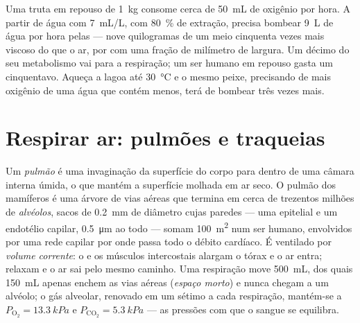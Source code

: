 \begin{example}\label{ex:b1:gas-exchange:priceofwater}
Uma truta em repouso de \qty{1}{kg} consome cerca de \qty{50}{mL} de
oxigênio por hora. A partir de água com \qty{7}{mL/L}, com
\qty{80}{\%} de extração, precisa bombear \qty{9}{L} de água por hora
pelas  --- nove quilogramas de um meio cinquenta vezes mais
viscoso do que o ar, por  com uma fração de milímetro de
largura. Um décimo do seu metabolismo vai para a respiração; um ser
humano em repouso gasta um cinquentavo. Aqueça a lagoa até
\qty{30}{\celsius} e o mesmo peixe, precisando de mais oxigênio de uma
água que contém menos, terá de bombear três vezes mais.
\end{example}

\section{Respirar ar: pulmões e traqueias}

\begin{definition}\label{def:b1:gas-exchange:lung}
Um \emph{pulmão} é uma invaginação da superfície do corpo para dentro
de uma câmara interna úmida, o que mantém a superfície molhada em ar
seco. O pulmão dos mamíferos é uma árvore de vias aéreas que termina
em cerca de trezentos milhões de \emph{alvéolos}, sacos de
\qty{0.2}{mm} de diâmetro cujas paredes --- uma  epitelial e um
endotélio capilar, \qty{0.5}{\micro m} ao todo --- somam
\qty{100}{m^2} num ser humano, envolvidos por uma rede capilar por
onde passa todo o débito cardíaco. É ventilado por \emph{volume
corrente}: o  e os músculos intercostais alargam o tórax e o
ar entra; relaxam e o ar sai pelo mesmo caminho. Uma respiração move
\qty{500}{mL}, dos quais \qty{150}{mL} apenas enchem as vias aéreas
(\emph{espaço morto}) e nunca chegam a um alvéolo; o gás alveolar,
renovado em um sétimo a cada respiração, mantém-se a $P_{\mathrm{O_2}} =
\qty{13.3}{kPa}$ e $P_{\mathrm{CO_2}} = \qty{5.3}{kPa}$ --- as
pressões com que o sangue se equilibra.
\end{definition}

